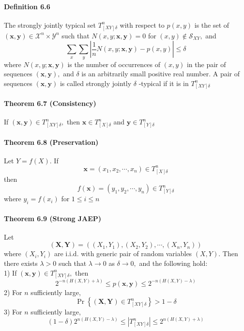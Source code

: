 \documentclass[8pt]{article}
\begin{document}
\paragraph{Definition 6.6} The strongly jointly typical set $T_{[X Y] \delta}^{n}$ with respect to $p(x, y)$ is the set of $(\mathbf{x}, \mathbf{y}) \in \mathcal{X}^{n} \times \mathcal{Y}^{n}$ such that $N(x, y ; \mathbf{x}, \mathbf{y})=0$ for $(x, y) \notin \mathcal{S}_{X Y},$ and
$$
\sum_{x} \sum_{y}\left|\frac{1}{n} N(x, y ; \mathbf{x}, \mathbf{y})-p(x, y)\right| \leq \delta
$$
where $N(x, y ; \mathbf{x}, \mathbf{y})$ is the number of occurrences of $(x, y)$ in the pair of sequences $(\mathbf{x}, \mathbf{y}),$ and $\delta$ is an arbitrarily small positive real number. A pair of sequences $(\mathbf{x}, \mathbf{y})$ is called strongly jointly $\delta$ -typical if it is in $T_{[X Y] \delta}^{n}$

\paragraph{Theorem 6.7 (Consistency)} If $(\mathbf{x}, \mathbf{y}) \in T_{[X Y] \delta}^{n},$ then $\mathbf{x} \in T_{[X] \delta}^{n}$ and $\mathbf{y} \in T_{[Y] \delta}^{n}$

\paragraph{Theorem 6.8 (Preservation)} Let $Y=f(X)$. If
$$
\mathbf{x}=\left(x_{1}, x_{2}, \cdots, x_{n}\right) \in T_{[X] \delta}^{n}
$$
then
$$
f(\mathbf{x})=\left(y_{1}, y_{2}, \cdots, y_{n}\right) \in T_{[Y] \delta}^{n}
$$
where $y_{i}=f\left(x_{i}\right)$ for $1 \leq i \leq n$

\paragraph{Theorem 6.9 (Strong JAEP)} Let
$$
(\mathbf{X}, \mathbf{Y})=\left(\left(X_{1}, Y_{1}\right),\left(X_{2}, Y_{2}\right), \cdots,\left(X_{n}, Y_{n}\right)\right)
$$
where $\left(X_{i}, Y_{i}\right)$ are i.i.d. with generic pair of random variables $(X, Y) .$ Then there exists $\lambda>0$ such that $\lambda \rightarrow 0$ as $\delta \rightarrow 0,$ and the following hold: \\
1) If $(\mathbf{x}, \mathbf{y}) \in T_{[X Y] \delta}^{n},$ then
$$
2^{-n(H(X, Y)+\lambda)} \leq p(\mathbf{x}, \mathbf{y}) \leq 2^{-n(H(X, Y)-\lambda)}
$$
2) For $n$ sufficiently large,
$$
\operatorname{Pr}\left\{(\mathbf{X}, \mathbf{Y}) \in T_{[X Y] \delta}^{n}\right\}>1-\delta
$$
3) For $n$ sufficiently large,
$$
(1-\delta) 2^{n(H(X, Y)-\lambda)} \leq\left|T_{[X Y] \delta}^{n}\right| \leq 2^{n(H(X, Y)+\lambda)}
$$
\end{document}
